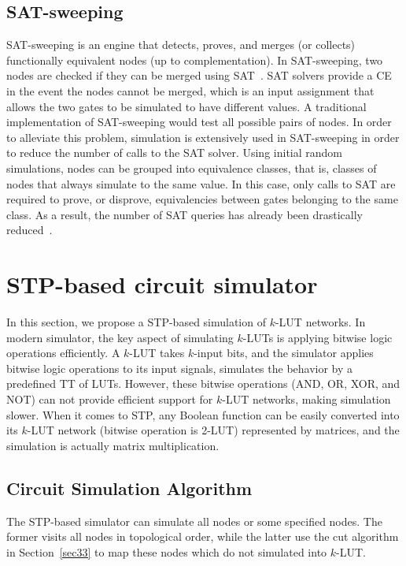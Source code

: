 \documentclass[conference]{IEEEtran}
\begin{document}
\subsection{SAT-sweeping}
\label{sec23}
SAT-sweeping is an engine that detects, proves, and merges (or collects) functionally equivalent nodes (up to complementation). 
In SAT-sweeping, two nodes are checked if they can be merged using SAT~\cite{pri4,sweep2}. 
SAT solvers provide a CE in the event the nodes cannot be merged, which is an input assignment that allows the two gates to be simulated to have different values.
A traditional implementation of SAT-sweeping would test all possible pairs of nodes.
In order to alleviate this problem, simulation is extensively used in SAT-sweeping in order to reduce the number of calls to the SAT solver.
Using initial random simulations, nodes can be grouped into equivalence classes, that is, classes of nodes that always simulate to the same value.
In this case, only calls to SAT are required to prove, or disprove, equivalencies between gates belonging to the same class.
As a result, the number of SAT queries has already been drastically reduced~\cite{sweep1}. 

\vspace{-2mm}
\section{STP-based circuit simulator}
\label{sec3}
In this section, we propose a STP-based simulation of $k$-LUT networks.
In modern simulator, the key aspect of simulating $k$-LUTs is applying bitwise logic operations efficiently. 
A $k$-LUT takes $k$-input bits, and the simulator applies bitwise logic operations to its input signals, simulates the behavior by a predefined TT of LUTs.
However, these bitwise operations (AND, OR, XOR, and NOT) can not provide efficient support for $k$-LUT networks, making simulation slower.
When it comes to STP, any Boolean function can be easily converted into its $k$-LUT network (bitwise operation is 2-LUT) represented by matrices, and the simulation is actually matrix multiplication.

\subsection{Circuit Simulation Algorithm}
\label{sec31}
The STP-based simulator can simulate all nodes or some specified nodes.
The former visits all nodes in topological order, while the latter use the cut algorithm in Section~\ref{sec33} to map these nodes which do not simulated into $k$-LUT. 
\end{document}
